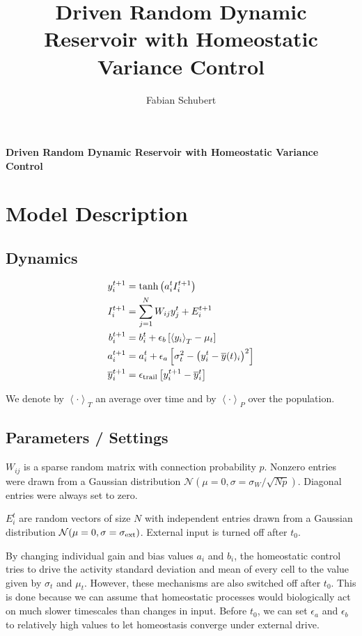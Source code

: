 \documentclass[10pt,a4paper]{article}
\author{Fabian Schubert}
\title{Driven Random Dynamic Reservoir with Homeostatic Variance Control}
\newcommand{\avgt}[1]{\left< #1 \right>_T}
\newcommand{\avgp}[1]{\left< #1 \right>_P}
\begin{document}
\begin{center}
\begin{LARGE}
\textbf{Driven Random Dynamic Reservoir with Homeostatic Variance Control}\\
\end{LARGE}
\end{center}

\section{Model Description}

\subsection{Dynamics}
\begin{align}
y_i^{t+1} &= \mathrm{tanh}\left( a_i^t I_i^{t+1} \right) \label{eq:reserv_dynamics}\\
I_i^{t+1} &= \sum_{j=1}^{N} W_{ij} y_j^t + E_i^{t+1} \label{eq:input_dynamics} \\
b_i^{t+1} &= b_i^t + \epsilon_{b} \left[ \avgt{y_i} - \mu_{t} \right] \\
a_i^{t+1} &= a_i^{t} + \epsilon_{a} \left[ \sigma_{t}^2 - \left( y_i^t - \overline{y}(t)_i\right)^2 \right] \label{eq:gain_dynamcis} \\
\overline{y}^{t+1}_i &= \epsilon_{\rm trail} \left[ y_i^{t+1} - \overline{y}^{t}_i\right]
\end{align}

We denote by $\avgt{\cdot}$ an average over time and by $\avgp{\cdot}$ over the population.

\subsection{Parameters / Settings}

$W_{ij}$ is a sparse random matrix with connection probability $p$. Nonzero entries were drawn from a Gaussian distribution $\mathcal{N}(\mu = 0,\sigma = \sigma_{W}/\sqrt{N p})$. Diagonal entries were always set to zero.


$E^t_{i}$ are random vectors of size $N$ with independent entries drawn from a Gaussian distribution $\mathcal{N}(\mu = 0,\sigma = \sigma_{\rm ext})$. External input is turned off after $t_0$.

By changing individual gain and bias values $a_i$ and $b_i$, the homeostatic control tries to drive the activity standard deviation and mean of every cell to the value given by $\sigma_{t}$ and $\mu_{t}$. However, these mechanisms are also switched off after $t_0$. This is done because we can assume that homeostatic processes would biologically act on much slower timescales than changes in input. Before $t_0$, we can set $\epsilon_{a}$ and $\epsilon_{b}$ to relatively high values to let homeostasis converge under external drive.
\end{document}
